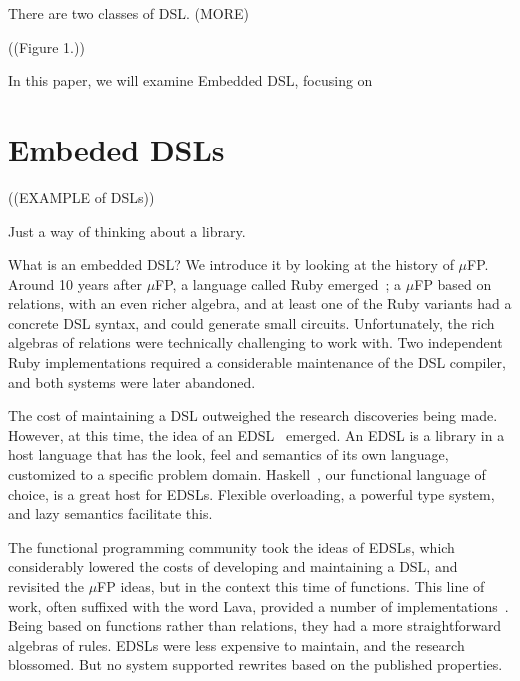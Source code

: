 \documentclass[11pt]{article}
\begin{document}
There are two classes of DSL. (MORE)

((Figure 1.))

In this paper, we will examine Embedded DSL, focusing on 

\section{Embeded DSLs}

((EXAMPLE of DSLs))

Just a way of thinking about a library.


What is an embedded DSL? We introduce it by looking
at the history of $\mu$FP. Around 10 years after
$\mu$FP, a language called Ruby emerged~\cite{Hutton:92:PhD,Hutton:93:RubyInterp};
a $\mu$FP based on relations, with an even richer algebra,
and at least one of the Ruby variants had a
concrete DSL syntax, and could generate small circuits.
Unfortunately, the rich algebras of relations
were technically challenging to work with.
Two independent Ruby implementations
required a considerable maintenance of the DSL compiler,
and both systems were later abandoned.

The cost of maintaining a DSL outweighed the research
discoveries being made. However, at this time,
the idea of an EDSL~\cite{Hudak:96:BuildingEDSLs,Elliott:03:CompileDSEL-JFP} emerged.
%
An EDSL is a library in a host language
that has the look, feel and semantics of its own language,
customized to a specific problem domain.
Haskell~\cite{Haskell98Book}, our functional language of choice, is a great host for EDSLs.
Flexible overloading, a powerful type system, and lazy semantics facilitate this.

The functional programming community took the ideas
of EDSLs, which considerably lowered the costs of developing
and maintaining a DSL, and revisited the $\mu$FP ideas,
but in the context this time of functions.
This line of work, often suffixed with the word Lava,
provided a number of implementations~\cite{Claessen:01:PhD,Singh:04:ReconfigLava,Sander:03:ForSyDe,ODonnell:02:Hydra}.
Being based on functions rather than relations,
they had a more straightforward algebras
of rules. EDSLs were less expensive to maintain, and the research blossomed.
But no system supported rewrites based on the published properties.
\end{document}
